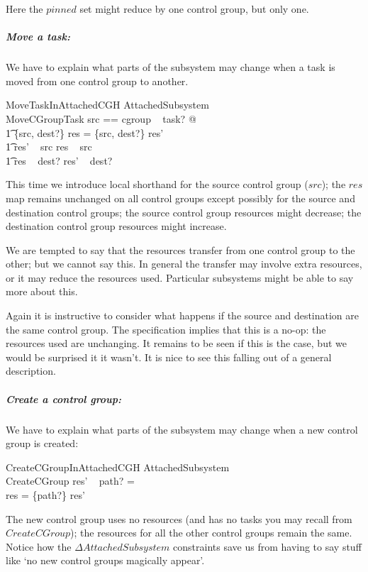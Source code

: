 \documentclass[a4paper,twoside,12pt]{article}
\begin{document}
Here the $pinned$ set might reduce by one control group, but only one.

\subparagraph{Move a task:}
We have to explain what parts of the subsystem may change when a task is moved from one control group to another.

\begin{schema}{MoveTaskInAttachedCGH}
\Delta AttachedSubsystem \\
MoveCGroupTask
\where
\LET src == cgroup ~ task? @ \\
\t1 \{src, dest?\} \ndres res = \{src, dest?\} \ndres res' \land \\
\t1 res' ~ src \subseteq res ~ src \land \\
\t1 res ~ dest? \subseteq res' ~ dest?
\end{schema}
This time we introduce local shorthand for the source control group ($src$); 
the $res$ map remains unchanged on all control groups except possibly for the source and destination control groups;
the source control group resources might decrease;
the destination control group resources might increase.

We are tempted to say that the resources transfer from one control group to the other; but we cannot say this. 
In general the transfer may involve extra resources, or it may reduce the resources used. Particular
subsystems might be able to say more about this.

Again it is instructive to consider what happens if the source and destination are the same control group. The specification implies that this is a no-op: the resources used are unchanging. It remains to be seen if this is the case,
but we would be surprised it it wasn't.  It is nice to see this falling out of a general description.

\subparagraph{Create a control group:}
We have to explain what parts of the subsystem may change when a new control group is created:

\begin{schema}{CreateCGroupInAttachedCGH}
\Delta AttachedSubsystem \\
CreateCGroup
\where
res' ~ path? = \emptyset \\
res = \{path?\} \ndres res' 
\end{schema}
The new control group uses no resources (and has no tasks you may recall from $CreateCGroup$); the resources
for all the other control groups remain the same. Notice how the $\Delta AttachedSubsystem$ constraints save us
from having to say stuff like `no new control groups magically appear'.
\end{document}
